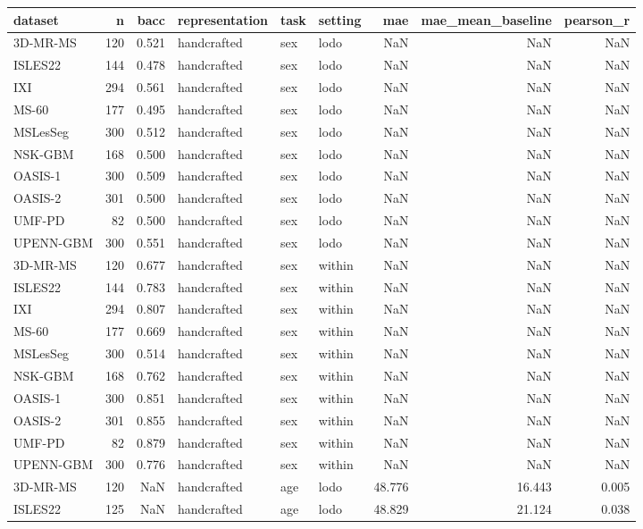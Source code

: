 \begin{tabular}{lrrlllrrr}
\toprule
dataset & n & bacc & representation & task & setting & mae & mae\_mean\_baseline & pearson\_r \\
\midrule
3D-MR-MS & 120 & 0.521 & handcrafted & sex & lodo & NaN & NaN & NaN \\
ISLES22 & 144 & 0.478 & handcrafted & sex & lodo & NaN & NaN & NaN \\
IXI & 294 & 0.561 & handcrafted & sex & lodo & NaN & NaN & NaN \\
MS-60 & 177 & 0.495 & handcrafted & sex & lodo & NaN & NaN & NaN \\
MSLesSeg & 300 & 0.512 & handcrafted & sex & lodo & NaN & NaN & NaN \\
NSK-GBM & 168 & 0.500 & handcrafted & sex & lodo & NaN & NaN & NaN \\
OASIS-1 & 300 & 0.509 & handcrafted & sex & lodo & NaN & NaN & NaN \\
OASIS-2 & 301 & 0.500 & handcrafted & sex & lodo & NaN & NaN & NaN \\
UMF-PD & 82 & 0.500 & handcrafted & sex & lodo & NaN & NaN & NaN \\
UPENN-GBM & 300 & 0.551 & handcrafted & sex & lodo & NaN & NaN & NaN \\
3D-MR-MS & 120 & 0.677 & handcrafted & sex & within & NaN & NaN & NaN \\
ISLES22 & 144 & 0.783 & handcrafted & sex & within & NaN & NaN & NaN \\
IXI & 294 & 0.807 & handcrafted & sex & within & NaN & NaN & NaN \\
MS-60 & 177 & 0.669 & handcrafted & sex & within & NaN & NaN & NaN \\
MSLesSeg & 300 & 0.514 & handcrafted & sex & within & NaN & NaN & NaN \\
NSK-GBM & 168 & 0.762 & handcrafted & sex & within & NaN & NaN & NaN \\
OASIS-1 & 300 & 0.851 & handcrafted & sex & within & NaN & NaN & NaN \\
OASIS-2 & 301 & 0.855 & handcrafted & sex & within & NaN & NaN & NaN \\
UMF-PD & 82 & 0.879 & handcrafted & sex & within & NaN & NaN & NaN \\
UPENN-GBM & 300 & 0.776 & handcrafted & sex & within & NaN & NaN & NaN \\
3D-MR-MS & 120 & NaN & handcrafted & age & lodo & 48.776 & 16.443 & 0.005 \\
ISLES22 & 125 & NaN & handcrafted & age & lodo & 48.829 & 21.124 & 0.038 \\

\end{tabular}
